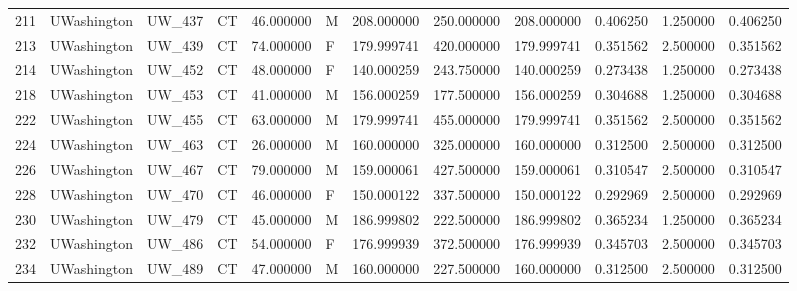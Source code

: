 \begin{tabular}{llllrlrrrrrr}
211    &     UWashington &       UW\_437 &                 CT &  46.000000 &        M &       208.000000 &    250.000000 &  208.000000 &               0.406250 &            1.250000 &          0.406250 \\
213    &     UWashington &       UW\_439 &                 CT &  74.000000 &        F &       179.999741 &    420.000000 &  179.999741 &               0.351562 &            2.500000 &          0.351562 \\
214    &     UWashington &       UW\_452 &                 CT &  48.000000 &        F &       140.000259 &    243.750000 &  140.000259 &               0.273438 &            1.250000 &          0.273438 \\
218    &     UWashington &       UW\_453 &                 CT &  41.000000 &        M &       156.000259 &    177.500000 &  156.000259 &               0.304688 &            1.250000 &          0.304688 \\
222    &     UWashington &       UW\_455 &                 CT &  63.000000 &        M &       179.999741 &    455.000000 &  179.999741 &               0.351562 &            2.500000 &          0.351562 \\
224    &     UWashington &       UW\_463 &                 CT &  26.000000 &        M &       160.000000 &    325.000000 &  160.000000 &               0.312500 &            2.500000 &          0.312500 \\
226    &     UWashington &       UW\_467 &                 CT &  79.000000 &        M &       159.000061 &    427.500000 &  159.000061 &               0.310547 &            2.500000 &          0.310547 \\
228    &     UWashington &       UW\_470 &                 CT &  46.000000 &        F &       150.000122 &    337.500000 &  150.000122 &               0.292969 &            2.500000 &          0.292969 \\
230    &     UWashington &       UW\_479 &                 CT &  45.000000 &        M &       186.999802 &    222.500000 &  186.999802 &               0.365234 &            1.250000 &          0.365234 \\
232    &     UWashington &       UW\_486 &                 CT &  54.000000 &        F &       176.999939 &    372.500000 &  176.999939 &               0.345703 &            2.500000 &          0.345703 \\
234    &     UWashington &       UW\_489 &                 CT &  47.000000 &        M &       160.000000 &    227.500000 &  160.000000 &               0.312500 &            2.500000 &          0.312500 \\

\end{tabular}
